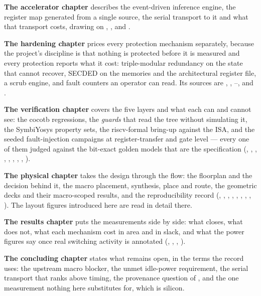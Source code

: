 \textbf{The accelerator chapter} describes the event-driven inference
engine, the register map generated from a single source, the serial
transport to it and what that transport costs, drawing on ,
,  and .

\textbf{The hardening chapter} prices every protection mechanism
separately, because the project's discipline is that nothing is
protected before it is measured and every protection reports what it
cost: triple-modular redundancy on the state that cannot recover, SECDED
on the memories and the architectural register file, a scrub engine, and
fault counters an operator can read. Its sources are ,
, --,  and .

\textbf{The verification chapter} covers the five layers and what each
can and cannot see: the cocotb regressions, the \emph{guards} that read
the tree without simulating it, the SymbiYosys property sets, the
riscv-formal bring-up against the ISA, and the seeded fault-injection
campaigns at register-transfer and gate level --- every one of them
judged against the bit-exact golden models that are the specification
(, , , , ,
, , , ).

\textbf{The physical chapter} takes the design through the flow: the
floorplan and the decision behind it, the macro placement, synthesis,
place and route, the geometric decks and their macro-scoped results, and
the reproducibility record (, , ,
, , , , ,
). The layout figures introduced here are read in detail
there.

\textbf{The results chapter} puts the measurements side by side: what
closes, what does not, what each mechanism cost in area and in slack,
and what the power figures say once real switching activity is annotated
(, , , ).

\textbf{The concluding chapter} states what remains open, in the terms
the record uses: the upstream macro blocker, the unmet idle-power
requirement, the serial transport that  ranks
above timing, the provenance question of , and the
one measurement nothing here substitutes for, which is silicon.
